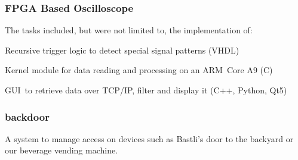 \begin{timeline}
    \subsubsection{FPGA Based Oscilloscope}
    The tasks included, but were not limited to, the implementation of:
    \begin{tightemize}
    \item Recursive trigger logic to detect special signal patterns (VHDL)
    \item Kernel module for data reading and processing on an ARM Core A9 (C)
    \item GUI to retrieve data over TCP/IP, filter and display it (C++, Python, Qt5)
    \end{tightemize}
    \sectionsep
    
    
    \subsubsection{backdoor}
    A system to manage access on devices such as Bastli's door to the backyard or our beverage vending machine.
    \end{timeline}%